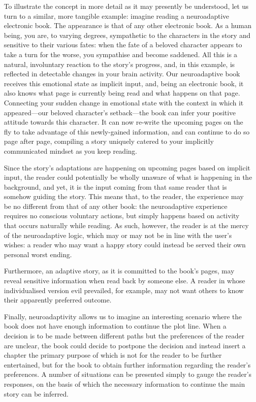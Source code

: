 To illustrate the concept in more detail as it may presently be understood, let us turn to a similar, more tangible example: imagine reading a neuroadaptive electronic book. The appearance is that of any other electronic book. As a human being, you are, to varying degrees, sympathetic to the characters in the story and sensitive to their various fates: when the fate of a beloved character appears to take a turn for the worse, you sympathise and become saddened. All this is a natural, involuntary reaction to the story's progress, and, in this example, is reflected in detectable changes in your brain activity. Our neuroadaptive book receives this emotional state as implicit input, and, being an electronic book, it also knows what page is currently being read and what happens on that page. Connecting your sudden change in emotional state with the context in which it appeared---our beloved character's setback---the book can infer your positive attitude towards this character. It can now re-write the upcoming pages on the fly to take advantage of this newly-gained information, and can continue to do so page after page, compiling a story uniquely catered to your implicitly communicated mindset as you keep reading.

Since the story's adaptations are happening on upcoming pages based on implicit input, the reader could potentially be wholly unaware of what is happening in the background, and yet, it is the input coming from that same reader that is somehow guiding the story. This means that, to the reader, the experience may be no different from that of any other book: the neuroadaptive experience requires no conscious voluntary actions, but simply happens based on activity that occurs naturally while reading. As such, however, the reader is at the mercy of the neuroadaptive logic, which may or may not be in line with the user's wishes: a reader who may want a happy story could instead be served their own personal worst ending.

Furthermore, an adaptive story, as it is committed to the book's pages, may reveal sensitive information when read back by someone else. A reader in whose individualised version evil prevailed, for example, may not want others to know their apparently preferred outcome. 

Finally, neuroadaptivity allows us to imagine an interesting scenario where the book does not have enough information to continue the plot line. When a decision is to be made between different paths but the preferences of the reader are unclear, the book could decide to postpone the decision and instead insert a chapter the primary purpose of which is not for the reader to be further entertained, but for the book to obtain further information regarding the reader's preferences. A number of situations can be presented simply to gauge the reader's responses, on the basis of which the necessary information to continue the main story can be inferred.

